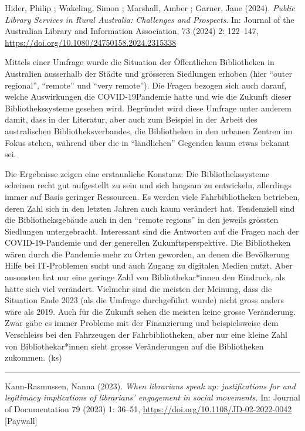 \documentclass[a4paper,
fontsize=11pt,
oneside,
numbers=noperiodatend,
parskip=half-,
bibliography=totoc,
final
]{scrartcl}
\begin{document}
Hider, Philip ; Wakeling, Simon ; Marshall, Amber ; Garner, Jane (2024).
\emph{Public Library Services in Rural Australia: Challenges and
Prospects}. In: Journal of the Australian Library and Information
Association, 73 (2024) 2: 122--147,
\url{https://doi.org/10.1080/24750158.2024.2315338}

Mittels einer Umfrage wurde die Situation der Öffentlichen Bibliotheken
in Australien ausserhalb der Städte und grösseren Siedlungen erhoben
(hier \enquote{outer regional}, \enquote{remote} und \enquote{very
remote}). Die Fragen bezogen sich auch darauf, welche Auswirkungen die
COVID-19Pandemie hatte und wie die Zukunft dieser Bibliothekssysteme
gesehen wird. Begründet wird diese Umfrage unter anderem damit, dass in
der Literatur, aber auch zum Beispiel in der Arbeit des australischen
Bibliotheksverbandes, die Bibliotheken in den urbanen Zentren im Fokus
stehen, während über die in \enquote{ländlichen} Gegenden kaum etwas
bekannt sei.

Die Ergebnisse zeigen eine erstaunliche Konstanz: Die Bibliothekssysteme
scheinen recht gut aufgestellt zu sein und sich langsam zu entwickeln,
allerdings immer auf Basis geringer Ressourcen. Es werden viele
Fahrbibliotheken betrieben, deren Zahl sich in den letzten Jahren auch
kaum verändert hat. Tendenziell sind die Bibliotheksgebäude auch in den
\enquote{remote regions} in den jeweils grössten Siedlungen
untergebracht. Interessant sind die Antworten auf die Fragen nach der
COVID-19-Pandemie und der generellen Zukunftsperspektive. Die
Bibliotheken wären durch die Pandemie mehr zu Orten geworden, an denen
die Bevölkerung Hilfe bei IT-Problemen sucht und auch Zugang zu
digitalen Medien nutzt. Aber ansonsten hat nur eine geringe Zahl von
Bibliothekar*innen den Eindruck, als hätte sich viel verändert. Vielmehr
sind die meisten der Meinung, dass die Situation Ende 2023 (als die
Umfrage durchgeführt wurde) nicht gross anders wäre als 2019. Auch für
die Zukunft sehen die meisten keine grosse Veränderung. Zwar gäbe es
immer Probleme mit der Finanzierung und beispielsweise dem Verschleiss
bei den Fahrzeugen der Fahrbibliotheken, aber nur eine kleine Zahl von
Bibliothekar*innen sieht grosse Veränderungen auf die Bibliotheken
zukommen. (ks)

\begin{center}\rule{0.5\linewidth}{0.5pt}\end{center}

Kann-Rasmussen, Nanna (2023). \emph{When librarians speak up:
justifications for and legitimacy implications of librarians' engagement
in social movements.} In: Journal of Documentation 79 (2023) 1: 36--51,
\url{https://doi.org/10.1108/JD-02-2022-0042} {[}Paywall{]}
\end{document}
